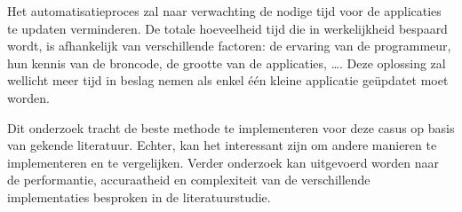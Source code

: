 Het automatisatieproces zal naar verwachting de nodige tijd voor de applicaties te updaten verminderen.
De totale hoeveelheid tijd die in werkelijkheid bespaard wordt, is afhankelijk van verschillende factoren: de ervaring van de programmeur, hun kennis van de broncode, de grootte van de applicaties, \dots.
Deze oplossing zal wellicht meer tijd in beslag nemen als enkel één kleine applicatie geüpdatet moet worden.

Dit onderzoek tracht de beste methode te implementeren voor deze casus op basis van gekende literatuur.
Echter, kan het interessant zijn om andere manieren te implementeren en te vergelijken.
Verder onderzoek kan uitgevoerd worden naar de performantie, accuraatheid en complexiteit van de verschillende implementaties besproken in de literatuurstudie.

